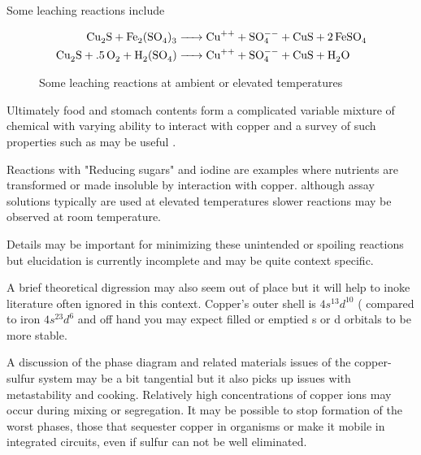 Some leaching reactions include 
\cite{Schlesinger_King_Sole_Hydrometallurgical_Copper_Extraction_2011}


\begin{figure}[ht]
\begin{align}
\cee{Cu_{2}S +Fe_2(SO_4)_3  & -> Cu^{++} + SO^{--}_4 + CuS + 2FeSO_4  } \\
\cee{Cu_{2}S +.5O_{2} + H_2(SO_4)  & -> Cu^{++} + SO^{--}_4 + CuS + H_2O  } \\
\end{align}
\caption{ \label{fig:leachers} Some leaching reactions
\cite{Schlesinger_King_Sole_Hydrometallurgical_Copper_Extraction_2011}
 at ambient or elevated temperatures  }
\end{figure}

Ultimately food and stomach contents form a complicated variable
mixture of chemical with varying ability to interact with copper
and a survey of such properties such as 
\cite{Manceau_Matynia_nature_2010} may be useful .



Reactions with "Reducing sugars"
and iodine are examples where nutrients are transformed
or made insoluble by interaction with copper. although
assay solutions typically are used at elevated temperatures
slower reactions may be observed at room temperature.

Details may be important for minimizing these unintended
or spoiling reactions but elucidation is currently incomplete
and may be quite context specific. 


A brief theoretical digression may also seem out of place
but it will help to inoke literature often ignored in this
context. 
Copper's outer shell is $4s^13d^{10}$
( compared to iron $4s^23d^6$
and off hand you may expect filled or emptied s or d orbitals
to be more stable. 
 

A discussion of the phase diagram and related materials
issues of the copper-sulfur system may be a bit tangential
but it also picks up issues with metastability and cooking.
Relatively high concentrations of copper ions may occur during
mixing or segregation.
It may be possible to stop formation of the worst phases,
those that sequester copper in organisms or make it
mobile in integrated circuits, even if sulfur can not
be well eliminated. 

